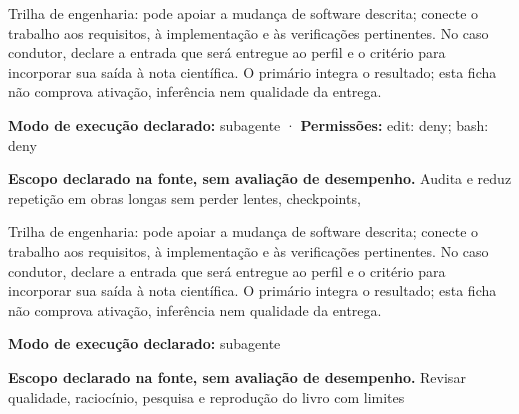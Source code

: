 \begin{funcao}
Trilha de engenharia: pode apoiar a mudança de software descrita; conecte o trabalho aos requisitos, à implementação e às verificações pertinentes. No caso condutor, declare a entrada que será entregue ao perfil e o critério para incorporar sua saída à nota científica. O primário integra o resultado; esta ficha não comprova ativação, inferência nem qualidade da entrega.
\end{funcao}

\begin{arquitetura}
\textbf{Modo de execução declarado:} subagente · \textbf{Permissões:} edit: deny; bash: deny
\end{arquitetura}


\begin{descricao}
\textbf{Escopo declarado na fonte, sem avaliação de desempenho.}
Audita e reduz repetição em obras longas sem perder lentes, checkpoints,
\end{descricao}

\begin{funcao}
Trilha de engenharia: pode apoiar a mudança de software descrita; conecte o trabalho aos requisitos, à implementação e às verificações pertinentes. No caso condutor, declare a entrada que será entregue ao perfil e o critério para incorporar sua saída à nota científica. O primário integra o resultado; esta ficha não comprova ativação, inferência nem qualidade da entrega.
\end{funcao}

\begin{arquitetura}
\textbf{Modo de execução declarado:} subagente
\end{arquitetura}


\begin{descricao}
\textbf{Escopo declarado na fonte, sem avaliação de desempenho.}
Revisar qualidade, raciocínio, pesquisa e reprodução do livro com limites
\end{descricao}


